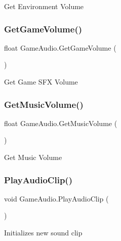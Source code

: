 Get Environment Volume 

\mbox{\label{class_game_audio_ad0ecbb6589554f4b800ad0210164f730}} 
\subsubsection{\texorpdfstring{Get\+Game\+Volume()}{GetGameVolume()}}
{\footnotesize\ttfamily float Game\+Audio.\+Get\+Game\+Volume (\begin{DoxyParamCaption}{ }\end{DoxyParamCaption})}



Get Game S\+FX Volume 

\mbox{\label{class_game_audio_ac21885c87c25cbf1a513b7173e4eca5a}} 
\subsubsection{\texorpdfstring{Get\+Music\+Volume()}{GetMusicVolume()}}
{\footnotesize\ttfamily float Game\+Audio.\+Get\+Music\+Volume (\begin{DoxyParamCaption}{ }\end{DoxyParamCaption})}



Get Music Volume 

\mbox{\label{class_game_audio_a2237e039b778cc481e9c78a83d4fd7c8}} 
\subsubsection{\texorpdfstring{Play\+Audio\+Clip()}{PlayAudioClip()}}
{\footnotesize\ttfamily void Game\+Audio.\+Play\+Audio\+Clip (\begin{DoxyParamCaption}{ }\end{DoxyParamCaption})}



Initializes new sound clip 

